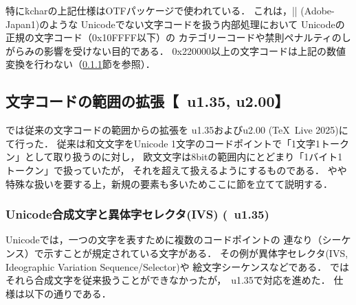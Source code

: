 \documentclass[a4paper,11pt,nomag,dvipdfmx]{jsarticle}
\begin{document}
\begin{dangerous}
\begin{itemize}
  \end{itemize}
  特に\.{kchar}の上記仕様はOTFパッケージで使われている．
  これは，|\CID| (Adobe-Japan1)のような
  Unicodeでない文字コードを扱う内部処理において
  Unicodeの正規の文字コード（0x10FFFF以下）の
  カテゴリーコードや禁則ペナルティのしがらみの影響を受けない目的である．
  0x220000以上の文字コードは上記の数値変換を行わない（\ref{sec:uptex_ivs}節を参照）．
\end{dangerous}

\subsection{文字コードの範囲の拡張【\upTeX~u1.35, u2.00】}\label{sec:uptex_extension}
\upTeX では従来の文字コードの範囲からの拡張を
u1.35およびu2.00 (\TeX~Live 2025)にて行った．
従来は和文文字をUnicode 1文字のコードポイントで「1文字1トークン」として取り扱うのに対し，
欧文文字は8bitの範囲内にとどまり「1バイト1トークン」で扱っていたが，
それを超えて扱えるようにするものである．
やや特殊な扱いを要する上，新規の要素も多いためここに節を立てて説明する．

\subsubsection{Unicode合成文字と異体字セレクタ(IVS) (\upTeX~u1.35)}\label{sec:uptex_ivs}
Unicodeでは，一つの文字を表すために複数のコードポイントの
連なり（シーケンス）で示すことが規定されている文字がある．
その例が異体字セレクタ(IVS, Ideographic Variation Sequence/Selector)\cite{ivd220913}や
絵文字シーケンス\cite{emseq160}などである．
\upTeX ではそれら合成文字を従来扱うことができなかったが，\upTeX~u1.35で対応を進めた\cite{tjb46}．
仕様は以下の通りである．
\end{document}
